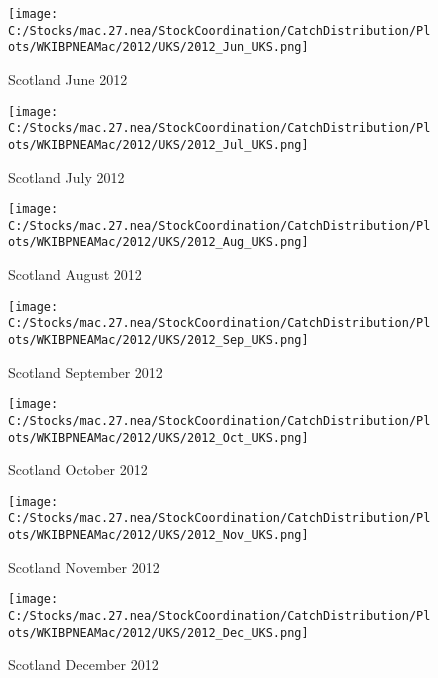 \documentclass{article}
\begin{document}
\begin{figure}
	\centering
		\texttt{[image: C:/Stocks/mac.27.nea/StockCoordination/CatchDistribution/Plots/WKIBPNEAMac/2012/UKS/2012\_Jun\_UKS.png]}
	\caption{Scotland June 2012}
	\label{fig:2012_Jun_UKS}
\end{figure}

\begin{figure}
	\centering
		\texttt{[image: C:/Stocks/mac.27.nea/StockCoordination/CatchDistribution/Plots/WKIBPNEAMac/2012/UKS/2012\_Jul\_UKS.png]}
	\caption{Scotland July 2012}
	\label{fig:2012_Jul_UKS}
\end{figure}

\begin{figure}
	\centering
		\texttt{[image: C:/Stocks/mac.27.nea/StockCoordination/CatchDistribution/Plots/WKIBPNEAMac/2012/UKS/2012\_Aug\_UKS.png]}
	\caption{Scotland August 2012}
	\label{fig:2012_Aug_UKS}
\end{figure}

\begin{figure}
	\centering
		\texttt{[image: C:/Stocks/mac.27.nea/StockCoordination/CatchDistribution/Plots/WKIBPNEAMac/2012/UKS/2012\_Sep\_UKS.png]}
	\caption{Scotland September 2012}
	\label{fig:2012_Sep_UKS}
\end{figure}

\begin{figure}
	\centering
		\texttt{[image: C:/Stocks/mac.27.nea/StockCoordination/CatchDistribution/Plots/WKIBPNEAMac/2012/UKS/2012\_Oct\_UKS.png]}
	\caption{Scotland October 2012}
	\label{fig:2012_Oct_UKS}
\end{figure}

\begin{figure}
	\centering
		\texttt{[image: C:/Stocks/mac.27.nea/StockCoordination/CatchDistribution/Plots/WKIBPNEAMac/2012/UKS/2012\_Nov\_UKS.png]}
	\caption{Scotland November 2012}
	\label{fig:2012_Nov_UKS}
\end{figure}

\begin{figure}
	\centering
		\texttt{[image: C:/Stocks/mac.27.nea/StockCoordination/CatchDistribution/Plots/WKIBPNEAMac/2012/UKS/2012\_Dec\_UKS.png]}
	\caption{Scotland December 2012}
	\label{fig:2012_Dec_UKS}
\end{figure}

\clearpage

\newpage
\end{document}

